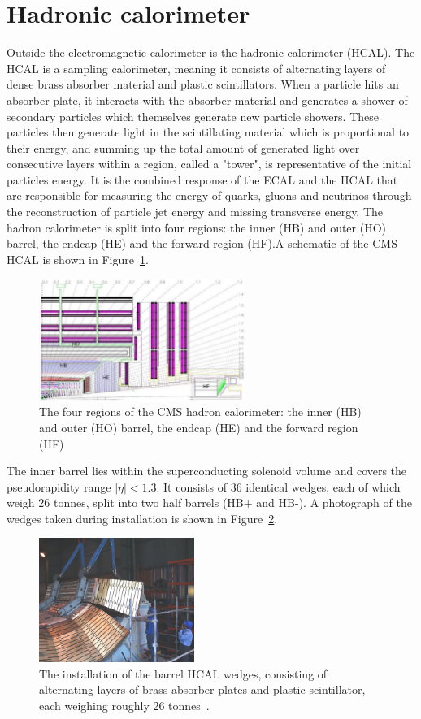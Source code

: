 \section{Hadronic calorimeter}
Outside the electromagnetic calorimeter is the hadronic calorimeter (HCAL). The HCAL is a sampling calorimeter, meaning it consists of alternating layers of dense brass absorber material and plastic scintillators. When a particle hits an absorber plate, it interacts with the absorber material and generates a shower of secondary particles which themselves generate new particle showers. These particles then generate light in the scintillating material which is proportional to their energy, and summing up the total amount of generated light over consecutive layers within a region, called a "tower", is representative of the initial particles energy. It is the combined response of the ECAL and the HCAL that are responsible for measuring the energy of quarks, gluons and neutrinos through the reconstruction of particle jet energy and missing transverse energy. The hadron calorimeter is split into four regions: the inner (HB) and outer (HO) barrel, the endcap (HE) and the forward region (HF).A schematic of the CMS HCAL is shown in Figure~\ref{fig:cms:hcal}.
\begin{figure}[h] 
    \centering
    \includegraphics[width=0.6\textwidth]{figures/cms/HCAL.pdf}
    \caption{The four regions of the CMS hadron calorimeter:  the inner (HB) and outer (HO) barrel, the endcap (HE) and the forward region (HF)~\cite{Chatrchyan:2008aa}}
    \label{fig:cms:hcal}
\end{figure}
The inner barrel lies within the superconducting solenoid volume and covers the pseudorapidity range $|\eta|<1.3$.
It consists of 36 identical wedges, each of which weigh 26 tonnes, split into two half barrels (HB+ and HB-).
A photograph of the wedges taken during installation is shown in Figure~\ref{fig:cms:hcal-wedges}. 
\begin{figure}[h] 
    \centering
    \includegraphics[width=0.45\textwidth]{figures/cms/hcal-2000-010_02.jpg}
    \caption{The installation of the barrel HCAL wedges, consisting of alternating layers of brass absorber plates and plastic scintillator, each weighing roughly 26 tonnes~\cite{Veillet:41645}.}
    \label{fig:cms:hcal-wedges}
\end{figure}
